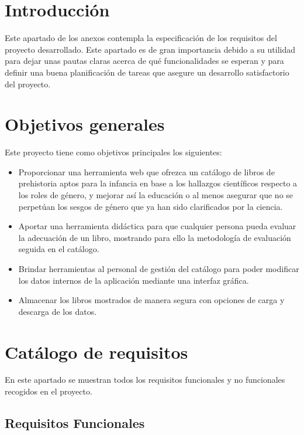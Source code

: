 
\section{Introducción}
Este apartado de los anexos contempla la especificación de los requisitos del proyecto desarrollado. Este apartado es de gran importancia debido a su utilidad para dejar unas pautas claras acerca de qué funcionalidades se esperan y para definir una buena planificación de tareas que asegure un desarrollo satisfactorio del proyecto.

\section{Objetivos generales}
Este proyecto tiene como objetivos principales los siguientes:
\begin{itemize}
    \item Proporcionar una herramienta web que ofrezca un catálogo de libros de prehistoria aptos para la infancia en base a los hallazgos científicos respecto a los roles de género, y mejorar así la educación o al menos asegurar que no se perpetúan los sesgos de género que ya han sido clarificados por la ciencia.
    \item Aportar una  herramienta didáctica para que cualquier persona pueda evaluar la adecuación de un libro, mostrando para ello la metodología de evaluación seguida en el catálogo. 
    \item Brindar herramientas al personal de gestión del catálogo para poder modificar los datos internos de la aplicación mediante una interfaz gráfica.
    \item Almacenar los libros mostrados de manera segura con opciones de carga y descarga de los datos.
\end{itemize}

\section{Catálogo de requisitos}
En este apartado se muestran todos los requisitos funcionales y no funcionales recogidos en el proyecto.

\subsection{Requisitos Funcionales}

